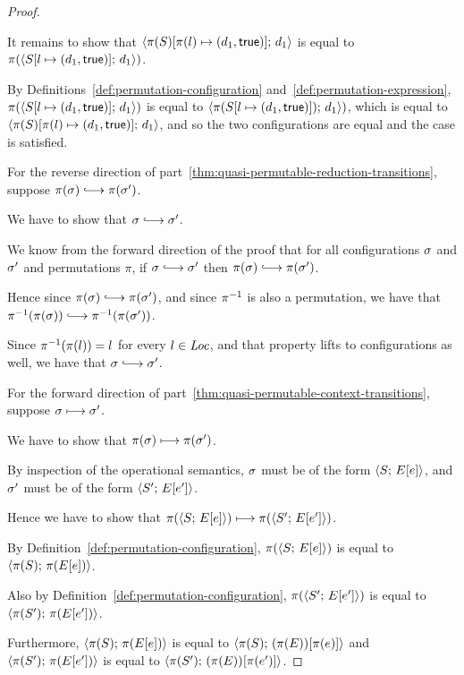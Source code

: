 \begin{proof}
\begin{itemize}
    It remains to show that
    $\langle \pi(S)[\pi(l) \mapsto (d_1, \textsf{true})];\, d_1 \rangle$ is equal
    to $\pi(\langle S[l \mapsto (d_1, \textsf{true})];\, d_1 \rangle)$.

    By Definitions~\ref{def:permutation-configuration}
    and~\ref{def:permutation-expression},
    $\pi(\langle S[l \mapsto (d_1, \textsf{true})];\, d_1 \rangle)$ is equal to
    $\langle \pi(S[l \mapsto (d_1, \textsf{true})]);\, d_1 \rangle)$, which is
    equal to
    $\langle \pi(S)[\pi(l) \mapsto (d_1, \textsf{true})];\, d_1 \rangle$, and so
    the two configurations are equal and the case is satisfied.

  \end{itemize}

  For the reverse direction of
  part~\ref{thm:quasi-permutable-reduction-transitions}, suppose
  $\pi(\conf) \parstepsto \pi(\conf')$.

  We have to show that $\conf \parstepsto \conf'$.

  We know from the forward direction of the proof that for all
  configurations $\sigma$ and $\sigma'$ and permutations $\pi$, if
  $\conf \parstepsto \conf'$ then $\pi(\conf) \parstepsto
  \pi(\conf')$.

  Hence since $\pi(\conf) \parstepsto \pi(\conf')$, and since $\pi^{-1}$
  is also a permutation, we have that $\piinv(\pi(\conf)) \parstepsto
  \piinv(\pi(\conf'))$.

  Since $\pi^{-1}(\pi(l)) = l$ for every $l \in \mathit{Loc}$, and that property
  lifts to configurations as well, we have that $\conf \parstepsto
  \conf'$.

  For the forward direction of
  part~\ref{thm:quasi-permutable-context-transitions}, suppose $\sigma
  \longmapsto \sigma'$.

  We have to show that $\pi(\sigma) \longmapsto \pi(\sigma')$.

  By inspection of the operational semantics, $\sigma$ must be of the
  form $\langle S;\, E\hspace{-0.5mm}\left[e\right] \rangle$, and $\sigma'$ must be of the form
  $\langle S';\, E\hspace{-0.5mm}\left[e'\right] \rangle$.

  Hence we have to show that $\pi(\langle S;\, E\hspace{-0.5mm}\left[e\right] \rangle) \longmapsto
  \pi(\langle S';\, E\hspace{-0.5mm}\left[e'\right] \rangle)$.

  By Definition~\ref{def:permutation-configuration},
  $\pi(\langle S;\, E\hspace{-0.5mm}\left[e\right] \rangle)$ is equal to $\langle \pi(S);\, \pi(E\hspace{-0.5mm}\left[e\right]) \rangle$.

  Also by Definition~\ref{def:permutation-configuration},
  $\pi(\langle S';\, E\hspace{-0.5mm}\left[e'\right] \rangle)$ is equal to
  $\langle \pi(S');\, \pi(E\hspace{-0.5mm}\left[e'\right]) \rangle$.

  Furthermore, $\langle \pi(S);\, \pi(E\hspace{-0.5mm}\left[e\right]) \rangle$ is equal to
  $\langle \pi(S);\, (\pi(E))\hspace{-0.5mm}\left[\pi(e)\right] \rangle$ and
  $\langle \pi(S');\, \pi(E\hspace{-0.5mm}\left[e'\right]) \rangle$ is equal to
  $\langle \pi(S');\, (\pi(E))\hspace{-0.5mm}\left[\pi(e')\right] \rangle$.


\end{proof}
